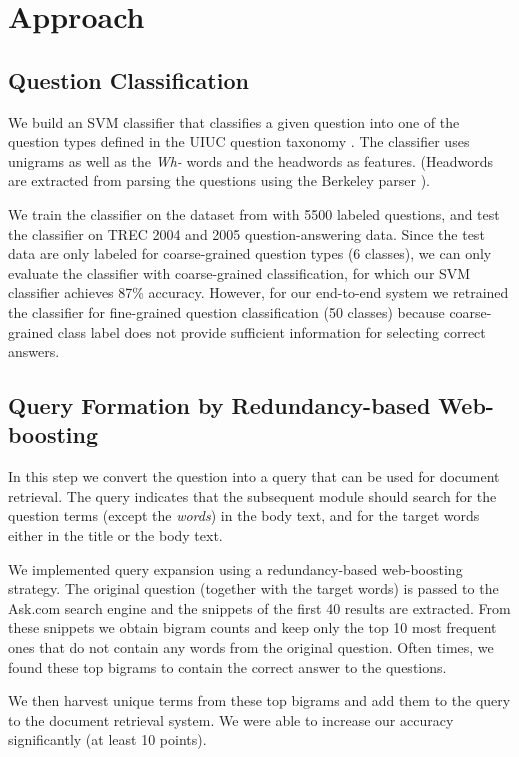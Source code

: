 \documentclass[11pt]{article}
\begin{document}
\section{Approach}
\subsection{Question Classification}
We build an SVM classifier that classifies a given question into one of the question types defined in the UIUC question taxonomy \cite{uiuc}. The classifier uses unigrams as well as the {\it Wh-} words and the headwords as features. (Headwords are extracted from parsing the questions using the Berkeley parser \cite{berkeleyparser}).

We train the classifier on the dataset from \cite{uiuc} with 5500 labeled questions, and test the classifier on TREC 2004 and 2005 question-answering data. Since the test data are only labeled for coarse-grained question types (6 classes), we can only evaluate the classifier with coarse-grained classification, for which our SVM classifier achieves 87\% accuracy. However, for our end-to-end system we retrained the classifier for fine-grained question classification (50 classes) because coarse-grained class label does not provide sufficient information for selecting correct answers.

\subsection{Query Formation by Redundancy-based Web-boosting}
In this step we convert the question into a query that can be used for document retrieval. The query indicates that the subsequent module should search for the question terms (except the {\it words}) in the body text, and for the target words either in the title or the body text.

We implemented query expansion using a redundancy-based web-boosting strategy. The original question (together with the target words) is passed to the Ask.com search engine and the snippets of the first 40 results are extracted. From these snippets we obtain bigram counts and keep only the top 10 most frequent ones that do not contain any words from the original question. Often times, we found these top bigrams to  contain the correct answer to the questions.

We then harvest unique terms from these top bigrams and add them to the query to the document retrieval system. We were able to increase our accuracy significantly (at least 10 points).
\end{document}
